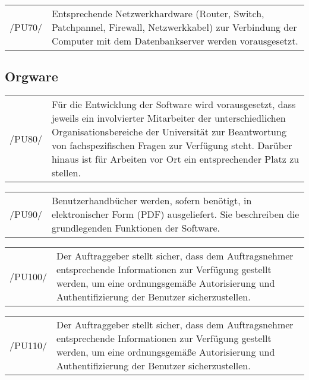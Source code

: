\begin{tabular}{p{1.5cm}p{14.5cm}}

	 /PU70/	&  Entsprechende Netzwerkhardware (Router, Switch, Patchpannel, Firewall, Netzwerkkabel) zur Verbindung der Computer mit dem Datenbankserver werden vorausgesetzt.\\[0.25cm]


\end{tabular}



\subsection{Orgware}
\label{subsec:orgware}

\begin{tabular}{p{1.5cm}p{14.5cm}}

	 /PU80/	&  Für die Entwicklung der Software wird vorausgesetzt, dass jeweils ein involvierter Mitarbeiter der unterschiedlichen Organisationsbereiche der Universität zur Beantwortung von fachspezifischen Fragen zur Verfügung steht. Darüber hinaus ist für Arbeiten vor Ort ein entsprechender Platz zu stellen.\\[0.25cm]


\end{tabular}

\begin{tabular}{p{1.5cm}p{14.5cm}}

	 /PU90/	&  Benutzerhandbücher werden, sofern benötigt, in elektronischer Form (PDF) ausgeliefert. Sie beschreiben die grundlegenden Funktionen der Software.\\[0.25cm]


\end{tabular}

\begin{tabular}{p{1.5cm}p{14.5cm}}

	 /PU100/	&  Der Auftraggeber stellt sicher, dass dem Auftragsnehmer entsprechende Informationen zur Verfügung gestellt werden, um eine ordnungsgemäße Autorisierung und Authentifizierung der Benutzer sicherzustellen.\\[0.25cm]


\end{tabular}

\begin{tabular}{p{1.5cm}p{14.5cm}}

	 /PU110/	&  Der Auftraggeber stellt sicher, dass dem Auftragsnehmer entsprechende Informationen zur Verfügung gestellt werden, um eine ordnungsgemäße Autorisierung und Authentifizierung der Benutzer sicherzustellen.\\[0.25cm]


\end{tabular}

